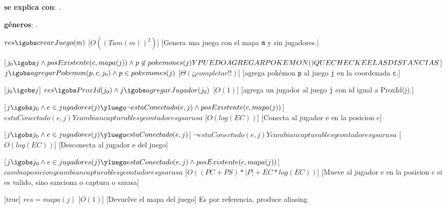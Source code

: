 \begin{Interfaz}


\textbf{se explica con}: .

\textbf{g\'eneros}: .






%
{$res \igobs crearJuego(m)$}%
[$O((Tam(m))^2)$]
[Genera una juego con el mapa \texttt{m} y sin jugadores.]


[$j_0 \igobs j \land posExistente(c, mapa(j)) \land p \not \in pokemones(j) Y PUEDOAGREGARPOKEMON() QUE CHECKEE LAS DISTANCIAS $]  
{$j \igobs agregarPokemon(p, c, j_0)  \land p \in pokemones(j)$}
[$\Theta(¡¡completar!!)$]
[agrega pok\'emon \texttt{p} al juego \texttt{j} en la coordenada \texttt{c}.]


[$ j_0 \igobs j $]
{$res \igobs ProxId(j_0) \land j \igobs agregarJugador(j_0)$}%
[$O(1)$]
[agrega un jugador al juego \texttt{j} con id igual a ProxId(j).]


%
[$j \igobs j_0 \land e \in jugadores(j) \yluego \neg estaConectado(e, j) \land posExistente(c, mapa(j)) $]
{$estaConectado(e, j) Y cambian capturables y contadores y sarasa$}%
[$O(log(EC))$] %
[Conecta al jugador e en la posicion c]


%
[$j \igobs j_0 \land e \in jugadores(j) \yluego estaConectado(e, j)$]
{$\neg estaConectado(e, j) Y cambian capturables y contadores y sarasa$}%
[$O(log(EC))$] %
[Desconecta al jugador e del juego]


%
[$j \igobs j_0 \land e \in jugadores(j) \yluego estaConectado(e, j) \land posExistente(c, mapa(j)) $]
{$cambia posicion y cambian capturables y contadores y sarasa$}%
[$O((PC + PS) * |P| + EC * log(EC))$] %
[Mueve al jugador e en la posicion c si es valido, sino sanciona o captura o sarasa]


%
[true]
{$res = mapa(j)$}%
[$O(1)$] %
[Devuelve el mapa del juego]
{Es por referencia, produce aliasing}



\end{Interfaz}
